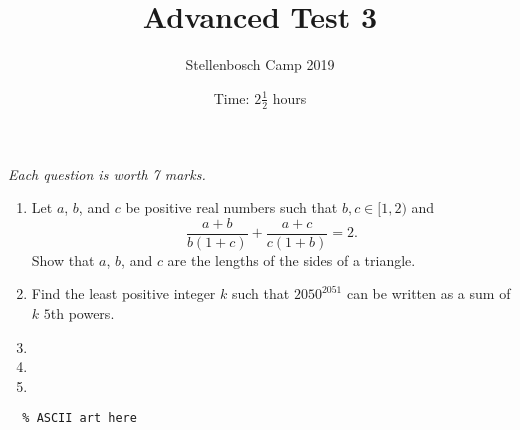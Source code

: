 \documentclass{article}
\title{Advanced Test 3}
\author{Stellenbosch Camp 2019}
\date{Time: $2\frac{1}{2}$ hours}
\begin{document}
\maketitle
\thispagestyle{empty}

\hfill\textit{Each question is worth 7 marks.}

\vfill


\begin{enumerate}[1.]

\item %
Let $a$, $b$, and $c$ be positive real numbers such that $b, c \in [1,2)$ and
\[ \frac{a+b}{b(1+c)} +\frac{a+c}{c(1+b)} = 2. \]
Show that $a$, $b$, and $c$ are the lengths of the sides of a triangle.


\item %
Find the least positive integer $k$ such that $2050^{2051}$ can be written as a sum of $k$ $5$th powers.


\item %


\item %


\item %

\end{enumerate}


\vfill
\begin{center}
\begin{BVerbatim}
\end{BVerbatim}
\end{center}
\end{document}
